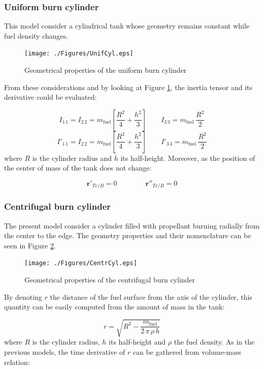 \subsubsection{Uniform burn cylinder}
This model consider a cylindrical tank whose geometry remains constant while fuel density changes.
\begin{figure}[htb!]
	\centering
	\texttt{[image: ./Figures/UnifCyl.eps]}
	\caption{Geometrical properties of the uniform burn cylinder}
	\label{fig:UnfBurnCyl}
\end{figure}
From these considerations and by looking at Figure \ref{fig:UnfBurnCyl}, the inertia tensor and its derivative could be evaluated:

\begin{equation}
	I_{1\,1}=I_{2\,2} = m_{\text{fuel}} \left[\frac{R^2}{4} + \frac{h^2}{3}\right]\qquad I_{3\,3} = m_{\text{fuel}}\,\frac{R^2}{2}
\end{equation}
\begin{equation}
	I'_{1\,1}=I_{2\,2} = \dot{m}_{\text{fuel}} \left[\frac{R^2}{4} + \frac{h^2}{3}\right]\qquad I'_{3\,3} = \dot{m}_{\text{fuel}}\,\frac{R^2}{2}
\end{equation}
\noindent
where $R$ is the cylinder radius and $h$ its half-height.\newline
Moreover, as the position of the center of mass of the tank does not change:

\begin{equation}
	\bm{r}'_{Tc/B} = 0 \qquad\qquad \bm{r}''_{Tc/B}=0
\end{equation}

\subsubsection{Centrifugal burn cylinder}
The present model consider a cylinder filled with propellant burning radially from the center to the edge. The geometry properties and their nomenclature can be seen in Figure \ref{fig:CentrCyl}.

\begin{figure}[htb!]
	\centering
	\texttt{[image: ./Figures/CentrCyl.eps]}
	\caption{Geometrical properties of the centrifugal burn cylinder}
	\label{fig:CentrCyl}
\end{figure}
By denoting $r$ the distance of the fuel surface from the axis of the cylinder, this quantity can be easily computed from the amount of mass in the tank:

\begin{equation}
	r =\sqrt{R^2 - \frac{m_\text{fuel}}{2\,\pi\,\rho\,h}}
\end{equation}
\noindent
where $R$ is the cylinder radius, $h$ its half-height and $\rho$ the fuel density.\newline
As in the previous models, the time derivative of $r$ can be gathered from volume-mass relation:

